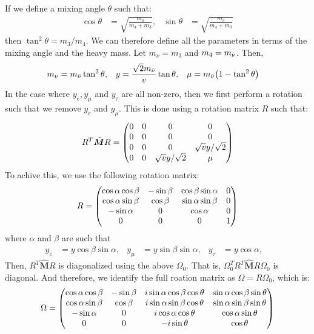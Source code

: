If we define a mixing angle \(\theta\) such that:
\begin{align}
	\cos\theta & = \sqrt{\frac{m_4}{m_4+m_3}}, &
	\sin\theta & = \sqrt{\frac{m_3}{m_4+m_3}}
\end{align}
then \(\tan^2\theta = m_{3}/m_{4}\). We can therefore define all the parameters in
terms of the mixing angle and the heavy mass. Let \(m_{\nu}=m_{3}\) and
\(m_{4} = m_{\bar{\nu}}\). Then,
\begin{align}
	m_{\nu} & = m_{\bar{\nu}}\tan^2\theta,                 &
	y       & = \frac{\sqrt{2}m_{\bar{\nu}}}{v}\tan\theta, &
	\mu     & = m_{\bar{\nu}}\qty(1-\tan^2\theta)
\end{align}
In the case where \(y_{e},y_{\mu}\) and \(y_{\tau}\) are all non-zero, then we
first perform a rotation such that we remove \(y_{e}\) and \(y_{\mu}\). This is
done using a rotation matrix \(R\) such that:
\begin{align}
	R^{T}\hat{\bm{M}}R =
	\mqty(
	0 & 0 & 0                  & 0                  \\
	0 & 0 & 0                  & 0                  \\
	0 & 0 & 0                  & \sqrt{v}y/\sqrt{2} \\
	0 & 0 & \sqrt{v}y/\sqrt{2} & \mu                \\
	)
\end{align}
To achive this, we use the following rotation matrix:
\begin{align}
	R = \mqty(
	\cos\alpha\cos\beta & -\sin\beta & \cos\beta\sin\alpha & 0 \\
	\cos\alpha\sin\beta & \cos\beta  & \sin\alpha\sin\beta & 0 \\
	-\sin\alpha         & 0          & \cos\alpha          & 0 \\
	0                   & 0          & 0                   & 1
	)
\end{align}
where \(\alpha\) and \(\beta\) are such that
\begin{align}
	y_{e}    & = y\cos\beta\sin\alpha, &
	y_{\mu}  & = y\sin\beta\sin\alpha, &
	y_{\tau} & = y\cos\alpha,          &
\end{align}
Then, \(R^{T}\hat{\bm{M}}R\) is diagonalized using the above \(\Omega_{0}\). That
is, \(\Omega^{T}_{0}R^{T}\hat{\bm{M}}R\Omega_{0}\) is diagonal. And therefore, we
identify the full roation matrix as \(\Omega = R\Omega_{0}\), which is:
\begin{align}
	\Omega = \mqty(
	\cos\alpha\cos\beta & -\sin\beta & i \sin\alpha\cos\beta\cos\theta & \sin\alpha\cos\beta\sin\theta \\
	\cos\alpha\sin\beta & \cos\beta  & i \sin\alpha\sin\beta\cos\theta & \sin\alpha\sin\beta\sin\theta \\
	-\sin\alpha         & 0          & i \cos\alpha\cos\theta          & \cos\alpha\sin\theta          \\
	0                   & 0          & -i \sin\theta                   & \cos\theta                    \\
	)
\end{align}

